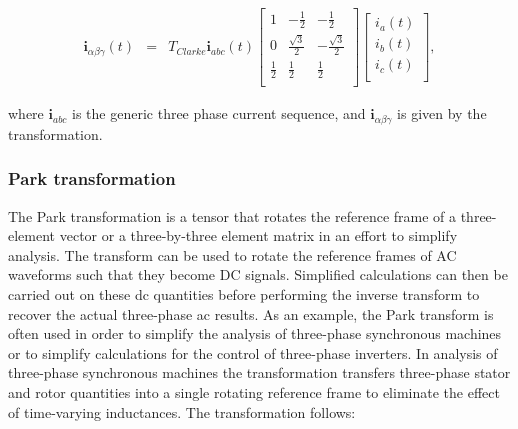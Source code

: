 \begin{equation}
        \begin{array}{rcl}
            \textbf{i}_{\alpha\beta\gamma}(t)&=&T_{Clarke}\textbf{i}_{abc}(t)
            \begin{bmatrix}
            1& -\frac{1}{2}& -\frac{1}{2}\\
            0& \frac{\sqrt{3}}{2}& -\frac{\sqrt{3}}{2}\\
            \frac{1}{2}& \frac{1}{2}& \frac{1}{2}\\
            \end{bmatrix}
            \begin{bmatrix}
            i_a(t)\\
            i_b(t)\\
            i_c(t)\\
            \end{bmatrix},
        \end{array}
        \label{BASICCSR:eqn:Clarke}
    \end{equation}

    where $\textbf{i}_{abc}$ is the generic three phase current sequence, and $\textbf{i}_{\alpha\beta\gamma}$ is given by the transformation.

    \subsubsection{Park transformation}\label{BASICCSR:sec:Park}

The Park transformation is a tensor that rotates the reference frame of a three-element vector or a three-by-three element matrix in an effort to simplify analysis. The transform can be used to rotate the reference frames of AC waveforms such that they become DC signals. Simplified calculations can then be carried out on these dc quantities before performing the inverse transform to recover the actual three-phase ac results. As an example, the Park transform is often used in order to simplify the analysis of three-phase synchronous machines or to simplify calculations for the control of three-phase inverters. In analysis of three-phase synchronous machines the transformation transfers three-phase stator and rotor quantities into a single rotating reference frame to eliminate the effect of time-varying inductances. The transformation follows:


